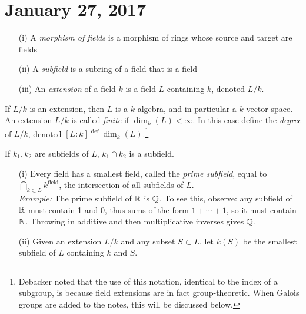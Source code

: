 \section{January 27, 2017}

\begin{defn} \label{Defn 1, Jan 27}
\hspace{0.5cm}
\begin{enumerate}
\item[(i)] A \textit{morphism of fields} is a morphism of rings whose source and target are fields
\item[(ii)] A \textit{subfield} is a subring of a field that is a field
\item[(iii)] An \textit{extension} of a field $k$ is a field $L$ containing $k$, denoted $L/k$.
\end{enumerate}
\end{defn}

\begin{rmk}
If $L/k$ is an extension, then $L$ is a $k$-algebra, and in particular a $k$-vector space. An extension $L/k$ is called \textit{finite} if $\dim_k(L) < \infty$. In this case define the \textit{degree} of $L/k$, denoted $[L : k] \stackrel{\text{def}}{=} \dim_k(L)$.\footnote{Debacker noted that the use of this notation, identical to the index of a subgroup, is because field extensions are in fact group-theoretic. When Galois groups are added to the notes, this will be discussed below.}
 \end{rmk}

\begin{fact} \label{Fact 2, Jan 27}
 If $k_1, k_2$ are subfields of $L$, $k_1 \cap k_2$ is a subfield.
\end{fact}

\begin{defn} \label{Defn 3, Jan 27}
\hspace{0.5cm}
\begin{enumerate}
\item[(i)] Every field has a smallest field, called the \textit{prime subfield}, equal to $\bigcap_{k \subset L} k^{\text{field}}$, the intersection of all subfields of $L$. \\
\textit{Example:} The prime subfield of $\mathbb{R}$ is $\mathbb{Q}$. To see this, observe: any subfield of $\mathbb{R}$ must contain 1 and 0, thus sums of the form $1 + \cdots + 1$, so it must contain $\mathbb{N}$. Throwing in additive and then multiplicative inverses gives $\mathbb{Q}$.
\item[(ii)] Given an extension $L/k$ and any subset $S \subset L$, let $k(S)$ be the smallest subfield of $L$ containing $k$ and $S$.
\end{enumerate}
\end{defn}

